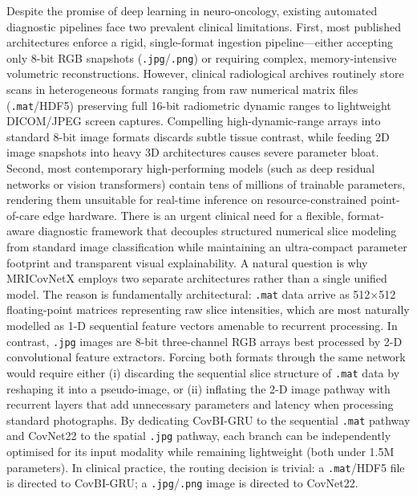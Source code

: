 \documentclass[a4paper,fleqn]{cas-sc}
\begin{document}
Despite the promise of deep learning in neuro-oncology, existing automated diagnostic pipelines face two prevalent clinical limitations. First, most published architectures enforce a rigid, single-format ingestion pipeline---either accepting only 8-bit RGB snapshots (\texttt{.jpg}/\texttt{.png}) or requiring complex, memory-intensive volumetric reconstructions. However, clinical radiological archives routinely store scans in heterogeneous formats ranging from raw numerical matrix files (\texttt{.mat}/HDF5) preserving full 16-bit radiometric dynamic ranges to lightweight DICOM/JPEG screen captures. Compelling high-dynamic-range arrays into standard 8-bit image formats discards subtle tissue contrast, while feeding 2D image snapshots into heavy 3D architectures causes severe parameter bloat. Second, most contemporary high-performing models (such as deep residual networks or vision transformers) contain tens of millions of trainable parameters, rendering them unsuitable for real-time inference on resource-constrained point-of-care edge hardware. There is an urgent clinical need for a flexible, format-aware diagnostic framework that decouples structured numerical slice modeling from standard image classification while maintaining an ultra-compact parameter footprint and transparent visual explainability. A natural question is why MRICovNetX employs two separate architectures rather than a single unified model. The reason is fundamentally architectural: \texttt{.mat} data arrive as 512$\times$512 floating-point matrices representing raw slice intensities, which are most naturally modelled as 1-D sequential feature vectors amenable to recurrent processing. In contrast, \texttt{.jpg} images are 8-bit three-channel RGB arrays best processed by 2-D convolutional feature extractors. Forcing both formats through the same network would require either (i) discarding the sequential slice structure of \texttt{.mat} data by reshaping it into a pseudo-image, or (ii) inflating the 2-D image pathway with recurrent layers that add unnecessary parameters and latency when processing standard photographs. By dedicating CovBI-GRU to the sequential \texttt{.mat} pathway and CovNet22 to the spatial \texttt{.jpg} pathway, each branch can be independently optimised for its input modality while remaining lightweight (both under 1.5M parameters). In clinical practice, the routing decision is trivial: a \texttt{.mat}/HDF5 file is directed to CovBI-GRU; a \texttt{.jpg}/\texttt{.png} image is directed to CovNet22.
\end{document}
